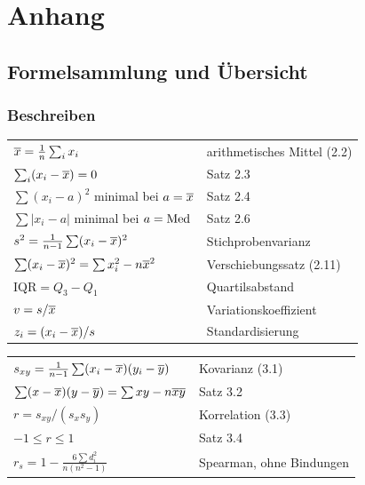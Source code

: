 \appendix
\part{Anhang}

\newcommand{\lit}[3]{\vspace{5pt}\noindent\textbf{[#1]} #2\par\nopagebreak\vspace{1pt}{\small\itshape\color{grau} #3}\par\vspace{2pt}}

\chapter{Formelsammlung und Übersicht}

\section{Beschreiben}

\begin{merksatz}
\begin{center}
{\small
\renewcommand{\arraystretch}{1.6}
\begin{tabular}{@{}P{4.4cm}P{4.2cm}@{}}
\toprule
$\overline{x} = \frac{1}{n}\sum_i x_i$ & arithmetisches Mittel (2.2)\\
$\sum_i (x_i-\overline{x}) = 0$ & Satz 2.3\\
$\sum(x_i-a)^2$ minimal bei $a=\overline{x}$ & Satz 2.4\\
$\sum|x_i-a|$ minimal bei $a=\operatorname{Med}$ & Satz 2.6\\
$s^2 = \frac{1}{n-1}\sum (x_i-\overline{x})^2$ & Stichprobenvarianz\\
$\sum(x_i-\overline{x})^2 = \sum x_i^2 - n\overline{x}^2$ & Verschiebungssatz (2.11)\\
$\mathrm{IQR} = Q_3 - Q_1$ & Quartilsabstand\\
$v = s/\overline{x}$ & Variationskoeffizient\\
$z_i = (x_i-\overline{x})/s$ & Standardisierung\\
\bottomrule
\end{tabular}}
\end{center}
\end{merksatz}

\begin{merksatz}
\begin{center}
{\small
\renewcommand{\arraystretch}{1.6}
\begin{tabular}{@{}P{4.4cm}P{4.2cm}@{}}
\toprule
$s_{xy} = \frac{1}{n-1}\sum(x_i-\overline{x})(y_i-\overline y)$ & Kovarianz (3.1)\\
$\sum(x-\overline{x})(y-\overline y) = \sum xy - n\overline{x}\overline y$ & Satz 3.2\\
$r = s_{xy}/(s_xs_y)$ & Korrelation (3.3)\\
$-1 \le r \le 1$ & Satz 3.4\\
$r_s = 1 - \frac{6\sum d_i^2}{n(n^2-1)}$ & Spearman, ohne Bindungen\\
\bottomrule
\end{tabular}}
\end{center}
\end{merksatz}

